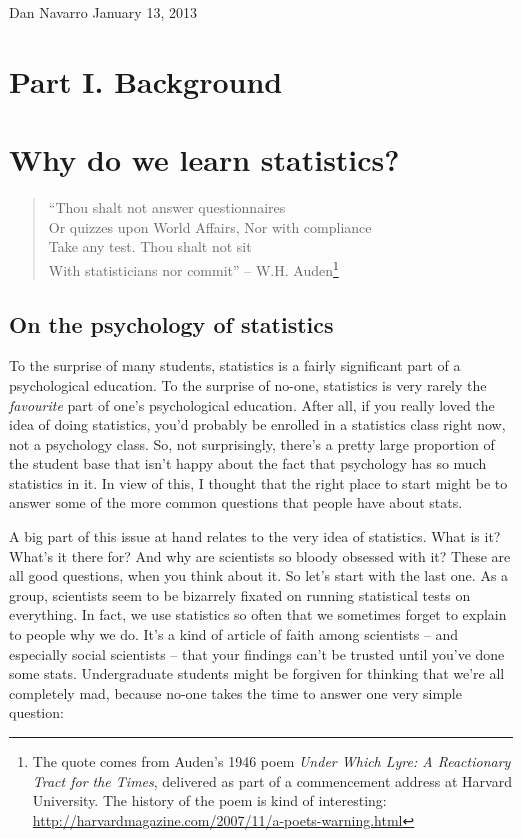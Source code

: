 \documentclass[
]{book}
\begin{document}
Dan Navarro
January 13, 2013

\hypertarget{part-i.-background}{%
\chapter*{Part I. Background}\label{part-i.-background}}

\hypertarget{why-do-we-learn-statistics}{%
\chapter{Why do we learn statistics?}\label{why-do-we-learn-statistics}}

\begin{quote}
``Thou shalt not answer questionnaires\\
Or quizzes upon World Affairs,
Nor with compliance\\
Take any test. Thou shalt not sit\\
With statisticians nor commit''
-- W.H. Auden\footnote{The quote comes from Auden's 1946 poem \emph{Under Which Lyre: A Reactionary Tract for the Times}, delivered as part of a commencement address at Harvard University. The history of the poem is kind of interesting: \url{http://harvardmagazine.com/2007/11/a-poets-warning.html}}
\end{quote}

\hypertarget{whywhywhy}{%
\section{On the psychology of statistics}\label{whywhywhy}}

To the surprise of many students, statistics is a fairly significant part of a psychological education. To the surprise of no-one, statistics is very rarely the \emph{favourite} part of one's psychological education. After all, if you really loved the idea of doing statistics, you'd probably be enrolled in a statistics class right now, not a psychology class. So, not surprisingly, there's a pretty large proportion of the student base that isn't happy about the fact that psychology has so much statistics in it. In view of this, I thought that the right place to start might be to answer some of the more common questions that people have about stats.

A big part of this issue at hand relates to the very idea of statistics. What is it? What's it there for? And why are scientists so bloody obsessed with it? These are all good questions, when you think about it. So let's start with the last one. As a group, scientists seem to be bizarrely fixated on running statistical tests on everything. In fact, we use statistics so often that we sometimes forget to explain to people why we do. It's a kind of article of faith among scientists -- and especially social scientists -- that your findings can't be trusted until you've done some stats. Undergraduate students might be forgiven for thinking that we're all completely mad, because no-one takes the time to answer one very simple question:
\end{document}
